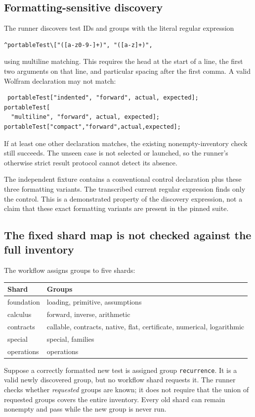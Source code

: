 \documentclass[11pt,letterpaper]{article}
\newcommand{\code}[1]{\nolinkurl{#1}}
\begin{document}
\subsection{Formatting-sensitive discovery}
The runner discovers test IDs and groups with the literal regular expression
\begin{lstlisting}
^portableTest\["([a-z0-9-]+)", "([a-z]+)",
\end{lstlisting}
using multiline matching. This requires the head at the start of a line,
the first two arguments on that line, and particular spacing after the first
comma. A valid Wolfram declaration may not match:
\begin{lstlisting}
 portableTest["indented", "forward", actual, expected];
portableTest[
  "multiline", "forward", actual, expected];
portableTest["compact","forward",actual,expected];
\end{lstlisting}
If at least one other declaration matches, the existing nonempty-inventory
check still succeeds. The unseen case is not selected or launched, so the
runner's otherwise strict result protocol cannot detect its absence.

The independent fixture contains a conventional control declaration plus
these three formatting variants. The transcribed current regular expression
finds only the control. This is a demonstrated property of the discovery
expression, not a claim that these exact formatting variants are present
in the pinned suite.

\subsection{The fixed shard map is not checked against the full inventory}
The workflow assigns groups to five shards:
\begin{center}
\begin{tabular}{lP{0.7\textwidth}}
\toprule
Shard & Groups\\\midrule
foundation & loading, primitive, assumptions\\
calculus & forward, inverse, arithmetic\\
contracts & callable, contracts, native, flat, certificate, numerical, logarithmic\\
special & special, families\\
operations & operations\\
\bottomrule
\end{tabular}
\end{center}
Suppose a correctly formatted new test is assigned group \code{recurrence}.
It is a valid newly discovered group, but no workflow shard requests it.
The runner checks whether \emph{requested} groups are known; it does not
require that the union of requested groups covers the entire inventory.
Every old shard can remain nonempty and pass while the new group is never run.
\end{document}
